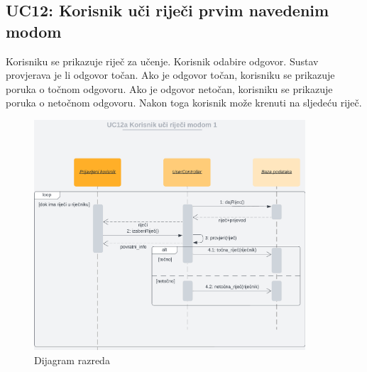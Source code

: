 				\subsection*{UC12: Korisnik uči riječi prvim navedenim modom}

				Korisniku se prikazuje riječ za učenje. Korisnik odabire odgovor. Sustav provjerava je li odgovor točan. Ako je odgovor točan, korisniku se prikazuje poruka o točnom odgovoru. Ako je odgovor netočan, korisniku se prikazuje poruka o netočnom odgovoru. Nakon toga korisnik može krenuti na sljedeću riječ.\\

				\begin{figure}[H]
					\includegraphics[width=0.9\textwidth]{dijagrami/UC12.png} 
					\centering
					\caption{Dijagram razreda}
					\label{fig:class_diagram}
				\end{figure}	
				\eject
	
